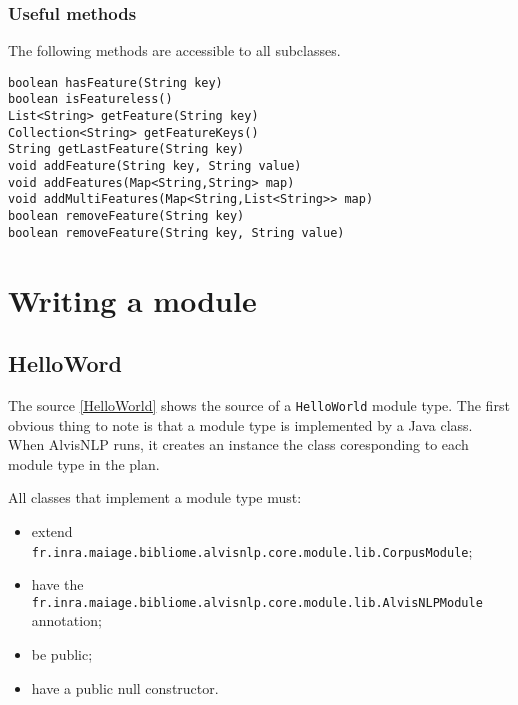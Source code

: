 \documentclass[a4paper]{article}
\begin{document}
\subsubsection{Useful methods}

The following methods are accessible to all subclasses.

\texttt{boolean hasFeature(String key)}\\
\texttt{boolean isFeatureless()}\\
\texttt{List<String> getFeature(String key)}\\
\texttt{Collection<String> getFeatureKeys()}\\
\texttt{String getLastFeature(String key)}\\
\texttt{void addFeature(String key, String value)}\\
\texttt{void addFeatures(Map<String,String> map)}\\
\texttt{void addMultiFeatures(Map<String,List<String>> map)}\\
\texttt{boolean removeFeature(String key)}\\
\texttt{boolean removeFeature(String key, String value)}\\


\section{Writing a module}

\subsection{HelloWord}

The source \ref{HelloWorld} shows the source of a \texttt{HelloWorld} module type.
The first obvious thing to note is that a module type is implemented by a Java class.
When AlvisNLP runs, it creates an instance the class coresponding to each module type in the plan.


All classes that implement a module type must:
\begin{itemize}
\item extend \texttt{fr.inra.maiage.bibliome.alvisnlp.core.module.lib.CorpusModule};
\item have the \texttt{fr.inra.maiage.bibliome.alvisnlp.core.module.lib.AlvisNLPModule} annotation;
\item be public;
\item have a public null constructor.
\end{itemize}
\end{document}
